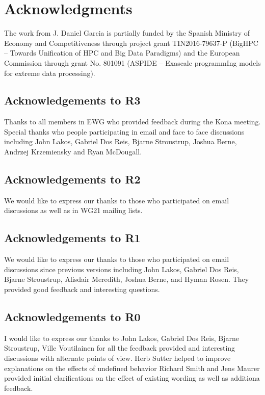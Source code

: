 \section*{Acknowledgments}

The work from J. Daniel Garcia is partially funded by
the Spanish Ministry of Economy and Competitiveness through project grant
TIN2016-79637-P (BigHPC -- Towards Unification of HPC and Big Data Paradigms)
and the European Commission through grant
No. 801091 (ASPIDE -- Exascale programmIng models for extreme data processing).

\subsection*{Acknowledgements to R3}

Thanks to all members in EWG who provided feedback during the Kona meeting.
Special thanks who people participating in email and face to face discussions including
John Lakos, Gabriel Dos Reis, Bjarne Stroustrup, Joshua Berne,
Andrzej Krzemiensky and Ryan McDougall.

\subsection*{Acknowledgements to R2}

We would like to express our thanks to those who participated on email discussions
as well as in WG21 mailing lists.

\subsection*{Acknowledgements to R1}

We would like to express our thanks to those who participated on email discussions
since previous versions including John Lakos, Gabriel Dos Reis, Bjarne Stroustrup,
Alisdair Meredith, Joshua Berne, and Hyman Rosen. They provided good feedback and
interesting questions.

\subsection*{Acknowledgements to R0}

I would like to express our thanks to John Lakos, Gabriel Dos Reis, Bjarne
Stroustrup, Ville Voutilainen for all the feedback provided and interesting
discussions with alternate points of view.
Herb Sutter helped to improve explanations on the effects of undefined behavior
Richard Smith and Jens Maurer provided initial clarifications on the effect of
existing wording as well as additiona feedback.

